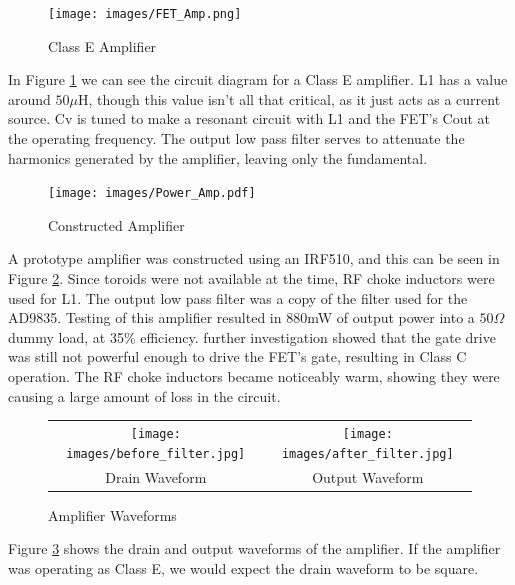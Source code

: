 \documentclass[a4paper,12pt]{article}
\begin{document}
\begin{figure}[h]
  \begin{center}
    \texttt{[image: images/FET\_Amp.png]}
  \end{center}
  \caption{Class E Amplifier}
  \label{fig:fet_amp}
\end{figure}

In Figure \ref{fig:fet_amp} we can see the circuit diagram for a Class E amplifier. L1 has a value around $50\mu$H, though this value isn't all that critical, as it just acts as a current source. Cv is tuned to make a resonant circuit with L1 and the FET's Cout at the operating frequency. The output low pass filter serves to attenuate the harmonics generated by the amplifier, leaving only the fundamental. 

\begin{figure}[h]
  \begin{center}
    \texttt{[image: images/Power\_Amp.pdf]}
  \end{center}
  \caption{Constructed Amplifier}
  \label{fig:power_amp}
\end{figure}

A prototype amplifier was constructed using an IRF510, and this can be seen in Figure \ref{fig:power_amp}. Since toroids were not available at the time, RF choke inductors were used for L1. The output low pass filter was a copy of the filter used for the AD9835. Testing of this amplifier resulted in 880mW of output power into a $50\Omega$ dummy load, at 35\% efficiency. further investigation showed that the gate drive was still not powerful enough to drive the FET's gate, resulting in Class C operation. The RF choke inductors became noticeably warm, showing they were causing a large amount of loss in the circuit. 

\begin{figure}[h]
\begin{center}
\begin{tabular}{cc}
\texttt{[image: images/before\_filter.jpg]}&
\texttt{[image: images/after\_filter.jpg]}\\
Drain Waveform & Output Waveform\\
\end{tabular}
\end{center}
\caption{Amplifier Waveforms}
\label{fig:amp_waveforms}
\end{figure}

Figure \ref{fig:amp_waveforms} shows the drain and output waveforms of the amplifier. If the amplifier was operating as Class E, we would expect the drain waveform to be square. 
\end{document}
